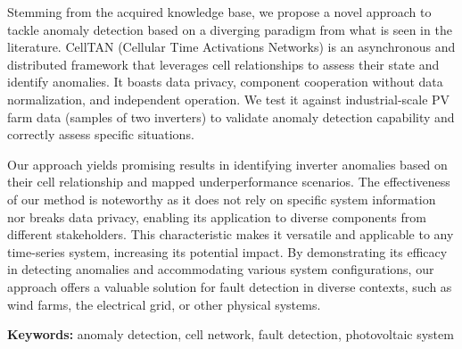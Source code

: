Stemming from the acquired knowledge base, we propose a novel approach to tackle anomaly detection based on a diverging paradigm from what is seen in the literature. CellTAN (Cellular Time Activations Networks) is an asynchronous and distributed framework that leverages cell relationships to assess their state and identify anomalies. It boasts data privacy, component cooperation without data normalization, and independent operation.
We test it against industrial-scale PV farm data (samples of two inverters) to validate anomaly detection capability and correctly assess specific situations.

Our approach yields promising results in identifying inverter anomalies based on their cell relationship and mapped underperformance scenarios. The effectiveness of our method is noteworthy as it does not rely on specific system information nor breaks data privacy, enabling its application to diverse components from different stakeholders. This characteristic makes it versatile and applicable to any time-series system, increasing its potential impact. By demonstrating its efficacy in detecting anomalies and accommodating various system configurations, our approach offers a valuable solution for fault detection in diverse contexts, such as wind farms, the electrical grid, or other physical systems.


\bigskip

\textbf{Keywords:} anomaly detection, cell network, fault detection, photovoltaic system

